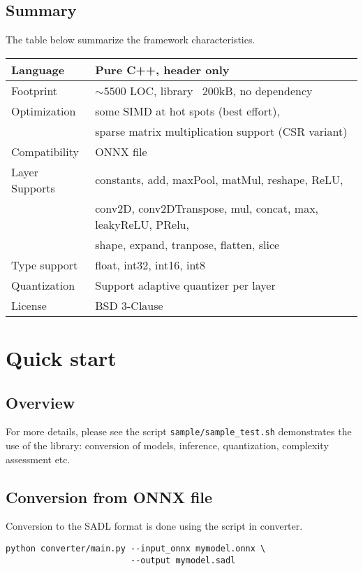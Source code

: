 \documentclass[10pt,a4paper]{article}
\begin{document}
\subsection{Summary}
The table below summarize the framework characteristics.
\begin{table}[]
\begin{tabular}{|l|l|}
\hline
Language & Pure C++, header only \\
\hline
Footprint & $\sim 5500$ LOC, library ~200kB, no dependency\\
\hline
Optimization & some SIMD at hot spots (best effort), \\
& sparse matrix multiplication support (CSR variant)\\
\hline
Compatibility & ONNX file\\
\hline
Layer Supports & constants, add, maxPool, matMul, reshape, ReLU, \\
& conv2D, conv2DTranspose, mul, concat, max, leakyReLU, PRelu, \\
& shape, expand, tranpose, flatten, slice \\
\hline
Type support & float, int32, int16, int8\\
\hline
Quantization & Support adaptive quantizer per layer\\
\hline
License & BSD 3-Clause \\
\hline
\end{tabular}
\end{table}


\section{Quick start}

\subsection{Overview}
For more details, please see the script \texttt{sample/sample\_test.sh} demonstrates the use of the library: conversion of models, inference, quantization, complexity assessment etc.


\subsection{Conversion from ONNX file}
Conversion to the SADL format is done using the script in converter.
\begin{lstlisting}[caption={SADL format conversion},style=code]
python converter/main.py --input_onnx mymodel.onnx \
                         --output mymodel.sadl
\end{lstlisting}
\end{document}
